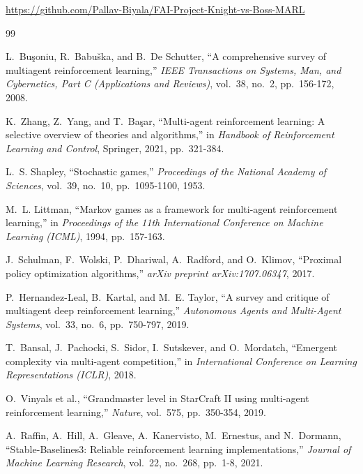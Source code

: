 \documentclass{article}
\begin{document}
\url{https://github.com/Pallav-Biyala/FAI-Project-Knight-vs-Boss-MARL}

\begin{thebibliography}{99}

L.~Bu{\c{s}}oniu, R.~Babu{\v{s}}ka, and B.~De Schutter,
\textquotedblleft A comprehensive survey of multiagent reinforcement learning,\textquotedblright
\emph{IEEE Transactions on Systems, Man, and Cybernetics, Part C (Applications and Reviews)}, vol.~38, no.~2, pp.~156-172, 2008.

K.~Zhang, Z.~Yang, and T.~Ba{\c{s}}ar,
\textquotedblleft Multi-agent reinforcement learning: A selective overview of theories and algorithms,\textquotedblright
in \emph{Handbook of Reinforcement Learning and Control}, Springer, 2021, pp.~321-384.

L.~S. Shapley,
\textquotedblleft Stochastic games,\textquotedblright
\emph{Proceedings of the National Academy of Sciences}, vol.~39, no.~10, pp.~1095-1100, 1953.

M.~L. Littman,
\textquotedblleft Markov games as a framework for multi-agent reinforcement learning,\textquotedblright
in \emph{Proceedings of the 11th International Conference on Machine Learning (ICML)}, 1994, pp.~157-163.

J.~Schulman, F.~Wolski, P.~Dhariwal, A.~Radford, and O.~Klimov,
\textquotedblleft Proximal policy optimization algorithms,\textquotedblright
\emph{arXiv preprint arXiv:1707.06347}, 2017.

P.~Hernandez-Leal, B.~Kartal, and M.~E. Taylor,
\textquotedblleft A survey and critique of multiagent deep reinforcement learning,\textquotedblright
\emph{Autonomous Agents and Multi-Agent Systems}, vol.~33, no.~6, pp.~750-797, 2019.

T.~Bansal, J.~Pachocki, S.~Sidor, I.~Sutskever, and O.~Mordatch,
\textquotedblleft Emergent complexity via multi-agent competition,\textquotedblright
in \emph{International Conference on Learning Representations (ICLR)}, 2018.

O.~Vinyals et al.,
\textquotedblleft Grandmaster level in StarCraft II using multi-agent reinforcement learning,\textquotedblright
\emph{Nature}, vol.~575, pp.~350-354, 2019.

A.~Raffin, A.~Hill, A.~Gleave, A.~Kanervisto, M.~Ernestus, and N.~Dormann,
\textquotedblleft Stable-Baselines3: Reliable reinforcement learning implementations,\textquotedblright
\emph{Journal of Machine Learning Research}, vol.~22, no.~268, pp.~1-8, 2021.

\end{thebibliography}
\end{document}
